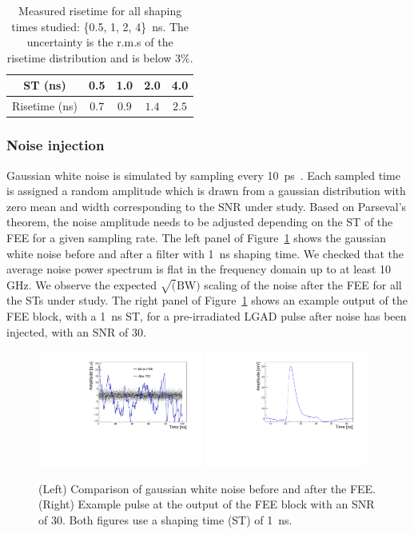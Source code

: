 \documentclass[preprint,1p]{elsarticle}
\begin{document}
\begin{table}
  \begin{center}
    \begin{tabular}{c|cccc}
    ST (ns) & 0.5  & 1.0 & 2.0 & 4.0 \\\hline
    Risetime (ns) & $0.7$ & $0.9$ & $1.4$ & $2.5$ \\
    \end{tabular}
    \caption{Measured risetime for all shaping times studied: \{0.5, 1, 2, 4\}~\si{ns}. The uncertainty is the r.m.s of the
    risetime distribution and is below 3\%.}
    \label{tab:risetime}
  \end{center}
 \end{table}


\subsubsection{Noise injection}\label{sec:noise_simulation}
Gaussian white noise is simulated by sampling every 10~\si{ps}~\cite{Radeka}. Each
sampled time is assigned a random amplitude which is drawn from a gaussian distribution with zero mean and width corresponding to the SNR under study. Based on Parseval's theorem, the noise amplitude needs to be adjusted depending
on the ST of the FEE for a given sampling rate. The left panel of Figure~\ref{fig:noise} shows the gaussian white
noise before and after a filter with 1~\si{ns} shaping time. We checked that the average noise power spectrum is flat in the frequency domain up to at least 10 GHz. We observe the expected $\sqrt(\mathrm{BW})$ scaling of the noise after
the FEE for all the STs under study. The right panel of Figure~\ref{fig:noise} shows an example output of the
FEE block, with a 1~\si{ns} ST, for a pre-irradiated LGAD pulse after noise has been injected, with an SNR of 30.

\begin{figure}[htbp]
  \centering
  \includegraphics[width=0.48\textwidth]{figs/noise_vs_shaped_noise.pdf} \hfill
  \includegraphics[width=0.48\textwidth]{figs/lgad_pre_rad_st_1ns_snr_30.pdf}
  \caption{(Left) Comparison of gaussian white noise before and after the FEE.
  (Right) Example pulse at the output of the FEE block with an SNR of 30. Both figures use a shaping time (ST) of 1~\si{ns}.}
  \label{fig:noise}
\end{figure}
\end{document}
